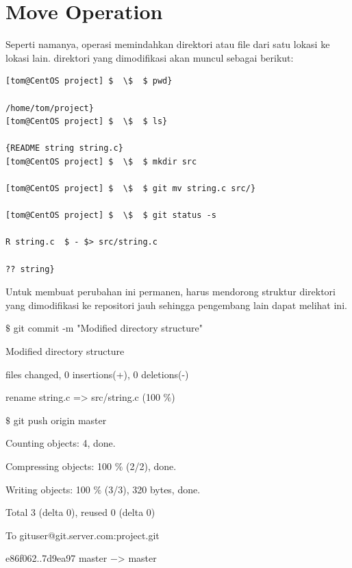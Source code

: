 \section{Move Operation}
\hspace*{0.5in}Seperti namanya, operasi memindahkan direktori atau file dari satu lokasi ke lokasi lain. direktori yang dimodifikasi akan muncul sebagai berikut: \par
\vspace{10pt}
\begin{verbatim}
[tom@CentOS project] $  \$  $ pwd} 

/home/tom/project} 
[tom@CentOS project] $  \$  $ ls} 

{README string string.c} 
[tom@CentOS project] $  \$  $ mkdir src

[tom@CentOS project] $  \$  $ git mv string.c src/} 

[tom@CentOS project] $  \$  $ git status -s

R string.c  $ - $> src/string.c

?? string}
\end{verbatim}

\vspace{10pt}
\hspace*{0.5in} Untuk membuat perubahan ini permanen, harus mendorong struktur direktori yang dimodifikasi ke repositori jauh sehingga pengembang lain dapat melihat ini. \par

 $  \$  $ git commit -m "Modified directory structure" \par
\vspace{12pt}
\noindent 
[master 7d9ea97] Modified directory structure \par
{} files changed, 0 insertions(+), 0 deletions(-) \par
\noindent 
rename string.c => src/string.c (100 $  \%  $) \par
\vspace{12pt}
 $  \$  $ git push origin master \par
\noindent 
Counting objects: 4, done. \par
\noindent 
Compressing objects: 100 $  \%  $ (2/2), done. \par
\noindent 
Writing objects: 100 $  \%  $ (3/3), 320 bytes, done. \par
\noindent 
Total 3 (delta 0), reused 0 (delta 0) \par
\noindent 
To gituser@git.server.com:project.git \par
\noindent 
e86f062..7d9ea97 master  $ - $> master \par

